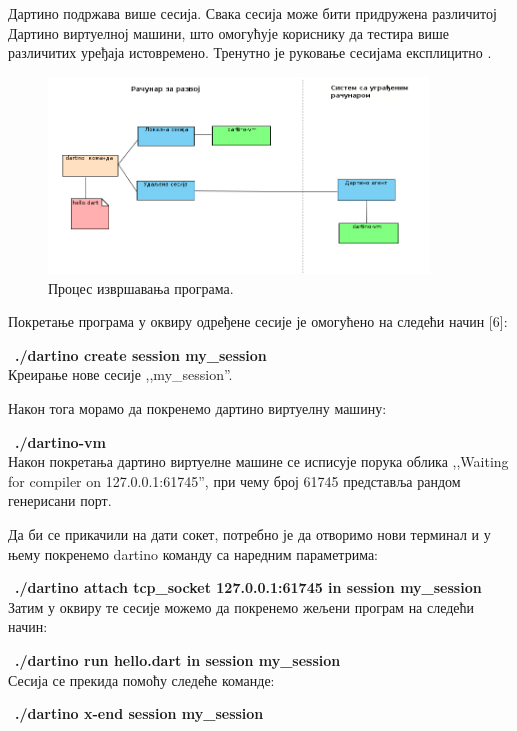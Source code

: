 \documentclass[12pt,oneside]{memoir}
\begin{document}
Дартино подржава више сесија. Свака сесија може бити придружена различитој Дартино виртуелној машини, што омогућује кориснику да тестира више различитих уређаја истовремено. Тренутно је руковање сесијама експлицитно \cite{Dartino, komande}.

\begin{figure}[!ht]
  \centering
  \includegraphics[width=0.9\textwidth]{sesije.png}
  \caption{Процес извршавања програма.}
  \label{fig:izvrsavanje}
\end{figure}

Покретање програма у оквиру одређене сесије је омогућено на следећи начин [6]:

~\textbf{./dartino create session my\_session}\\
Креирање нове сесије ,,my\_session''.

Након тога морамо да покренемо дартино виртуелну машину:

~\textbf{./dartino-vm}\\
Након покретања дартино виртуелне машине се исписује порука облика ,,Waiting for compiler on 127.0.0.1:61745'', при чему број 61745 представља рандом генерисани порт.

Да би се прикачили на дати сокет, потребно је да отворимо нови терминал и у њему покренемо dartino команду са наредним параметрима:

~\textbf{./dartino attach tcp\_socket 127.0.0.1:61745 in session my\_session}\\

Затим у оквиру те сесије можемо да покренемо жељени програм на следећи начин:

~\textbf{./dartino run hello.dart in session my\_session}\\

Сесија се прекида помоћу следеће команде:

~\textbf{./dartino x-end session my\_session}\\
\end{document}
